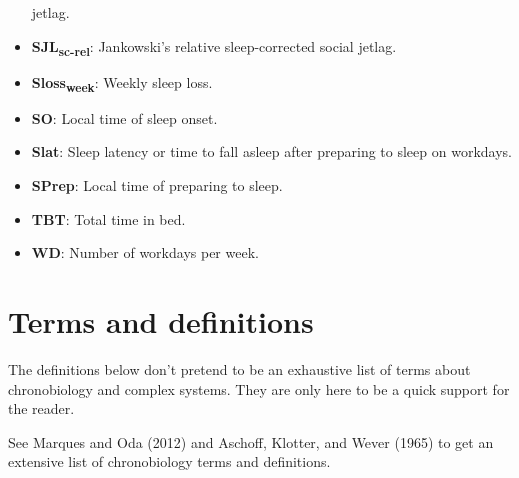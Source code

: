 \documentclass[
  12pt,
  a4paper,
  oneside]{tesesusp}
\begin{document}
\begin{itemize}
  jetlag.
\item
  \textbf{SJL\textsubscript{sc-rel}}: Jankowski's relative
  sleep-corrected social jetlag.
\item
  \textbf{Sloss\textsubscript{week}}: Weekly sleep loss.
\item
  \textbf{SO}: Local time of sleep onset.
\item
  \textbf{Slat}: Sleep latency or time to fall asleep after preparing to
  sleep on workdays.
\item
  \textbf{SPrep}: Local time of preparing to sleep.
\item
  \textbf{TBT}: Total time in bed.
\item
  \textbf{WD}: Number of workdays per week.
\end{itemize}

\hypertarget{terms-and-definitions}{%
\chapter*{Terms and definitions}\label{terms-and-definitions}}


The definitions below don't pretend to be an exhaustive list of terms
about chronobiology and complex systems. They are only here to be a
quick support for the reader.

See Marques and Oda (2012) and Aschoff, Klotter, and Wever (1965) to get
an extensive list of chronobiology terms and definitions.
\end{document}
